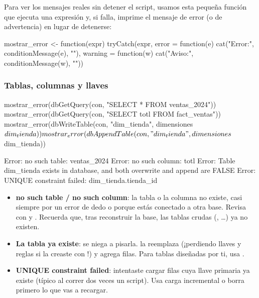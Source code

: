Para ver los mensajes reales sin detener el script, usamos esta pequeña
función que ejecuta una expresión y, si falla, imprime el mensaje de error
(o de advertencia) en lugar de detenerse:

\begin{rcode}
mostrar_error <- function(expr) {
  tryCatch(expr,
           error   = function(e) cat("Error:", conditionMessage(e), "\n"),
           warning = function(w) cat("Aviso:", conditionMessage(w), "\n"))
}
\end{rcode}

\subsubsection{Tablas, columnas y llaves}

\begin{rcode}
mostrar_error(dbGetQuery(con, "SELECT * FROM ventas_2024"))
mostrar_error(dbGetQuery(con, "SELECT totl FROM fact_ventas"))
mostrar_error(dbWriteTable(con, "dim_tienda", dimensiones$dim_tienda))
mostrar_error(dbAppendTable(con, "dim_tienda", dimensiones$dim_tienda))
\end{rcode}

\begin{rsalida}
Error: no such table: ventas_2024 
Error: no such column: totl 
Error: Table dim_tienda exists in database, and both overwrite and append are FALSE 
Error: UNIQUE constraint failed: dim_tienda.tienda_id 
\end{rsalida}

\begin{itemize}
  \item \textbf{no such table / no such column}: la tabla o la columna no
        existe, casi siempre por un error de dedo o porque estás conectado
        a otra base. Revisa con  y
        . Recuerda que, tras reconstruir
        la base, las tablas crudas (,
        \ldots) ya no existen.
  \item \textbf{La tabla ya existe}:  se niega a
        pisarla.  la reemplaza (¡perdiendo llaves y
        reglas si la creaste con !) y
         agrega filas. Para tablas diseñadas por ti,
        usa .
  \item \textbf{UNIQUE constraint failed}: intentaste cargar filas cuya
        llave primaria ya existe (típico al correr dos veces un script).
        Usa carga incremental o borra primero lo que vas a recargar.
\end{itemize}

